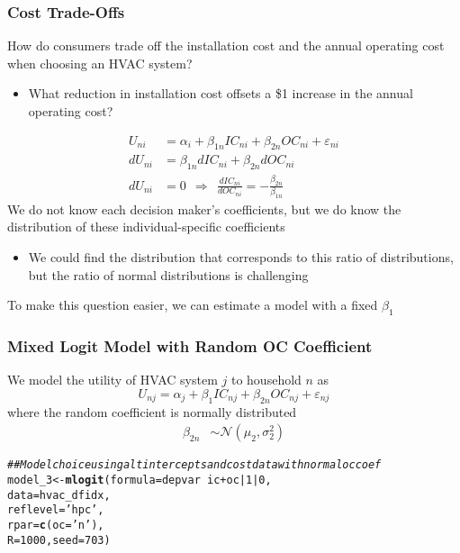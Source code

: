 \documentclass{beamer}\usepackage[]{graphicx}\usepackage[]{color}
\makeatletter
\newcommand{\hlnum}[1]{\textcolor[rgb]{0.686,0.059,0.569}{#1}}%
\newcommand{\hlstr}[1]{\textcolor[rgb]{0.192,0.494,0.8}{#1}}%
\newcommand{\hlcom}[1]{\textcolor[rgb]{0.678,0.584,0.686}{\textit{#1}}}%
\newcommand{\hlopt}[1]{\textcolor[rgb]{0,0,0}{#1}}%
\newcommand{\hlstd}[1]{\textcolor[rgb]{0.345,0.345,0.345}{#1}}%
\newcommand{\hlkwb}[1]{\textcolor[rgb]{0.69,0.353,0.396}{#1}}%
\newcommand{\hlkwc}[1]{\textcolor[rgb]{0.333,0.667,0.333}{#1}}%
\newcommand{\hlkwd}[1]{\textcolor[rgb]{0.737,0.353,0.396}{\textbf{#1}}}%
\newenvironment{kframe}{%
 \def\at@end@of@kframe{}%
 \ifinner\ifhmode%
  \def\at@end@of@kframe{\end{minipage}}%
  \begin{minipage}{\columnwidth}%
 \fi\fi%
 \def\FrameCommand##1{\hskip\@totalleftmargin \hskip-\fboxsep
 \colorbox{shadecolor}{##1}\hskip-\fboxsep
     \hskip-\linewidth \hskip-\@totalleftmargin \hskip\columnwidth}%
 \MakeFramed {\advance\hsize-\width
   \@totalleftmargin\z@ \linewidth\hsize
   \@setminipage}}%
 {\par\unskip\endMakeFramed%
 \at@end@of@kframe}
\newenvironment{knitrout}{}{} %
\makeatother
\begin{document}
\begin{frame}\frametitle{Cost Trade-Offs}
    How do consumers trade off the installation cost and the annual operating cost when choosing an HVAC system?
    \begin{itemize}
        \item What reduction in installation cost offsets a \$1 increase in the annual operating cost?
    \end{itemize}
    \begin{align*}
        U_{ni} & = \alpha_i + \beta_{1n} IC_{ni} + \beta_{2n} OC_{ni} + \varepsilon_{ni} \\
        dU_{ni} & = \beta_{1n} dIC_{ni} + \beta_{2n} dOC_{ni} \\
        dU_{ni} & = 0 ~~ \Rightarrow ~~ \frac{dIC_{ni}}{dOC_{ni}} = -\frac{\beta_{2n}}{\beta_{1n}}
    \end{align*}
    We do not know each decision maker's coefficients, but we do know the distribution of these individual-specific coefficients
    \begin{itemize}
    	\item We could find the distribution that corresponds to this ratio of distributions, but the ratio of normal distributions is challenging
    \end{itemize}
    \vspace{2ex}
    To make this question easier, we can estimate a model with a fixed $\beta_1$
\end{frame}

\begin{frame}[fragile]\frametitle{Mixed Logit Model with Random OC Coefficient}
    We model the utility of HVAC system $j$ to household $n$ as
    $$U_{nj} = \alpha_j + \beta_1 IC_{nj} + \beta_{2n} OC_{nj} + \varepsilon_{nj}$$
	  where the random coefficient is normally distributed
	  \begin{align*}
		  \beta_{2n} & \sim \mathcal{N}(\mu_2, \sigma_2^2)
	  \end{align*}
\begin{knitrout}\footnotesize
{}\color{fgcolor}\begin{kframe}
\begin{alltt}
\hlcom{## Model choice using alt intercepts and cost data with normal oc coef}
\hlstd{model_3} \hlkwb{<-} \hlkwd{mlogit}\hlstd{(}\hlkwc{formula} \hlstd{= depvar} \hlopt{~} \hlstd{ic} \hlopt{+} \hlstd{oc} \hlopt{|} \hlnum{1} \hlopt{|} \hlnum{0}\hlstd{,}
                  \hlkwc{data} \hlstd{= hvac_dfidx,}
                  \hlkwc{reflevel} \hlstd{=} \hlstr{'hpc'}\hlstd{,}
                  \hlkwc{rpar} \hlstd{=} \hlkwd{c}\hlstd{(}\hlkwc{oc} \hlstd{=} \hlstr{'n'}\hlstd{),}
                  \hlkwc{R} \hlstd{=} \hlnum{1000}\hlstd{,} \hlkwc{seed} \hlstd{=} \hlnum{703}\hlstd{)}
\end{alltt}
\end{kframe}
\end{knitrout}
\end{frame}
\end{document}
